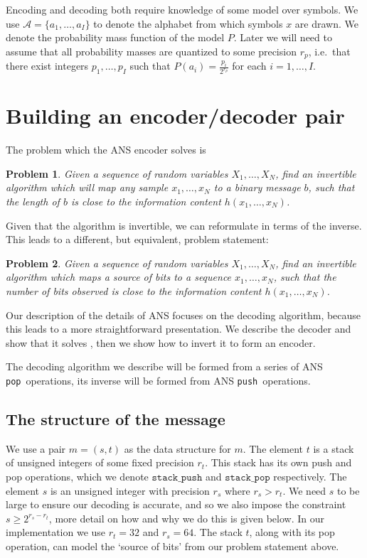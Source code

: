 \documentclass{article}
\newtheorem{problem}{Problem}
\newcommand{\push}{\texttt{push}}
\newcommand{\pop}{\texttt{pop}}
\begin{document}
Encoding and decoding both require knowledge of some model over symbols. We use
\(\mathcal{A} = \{a_1, \ldots, a_I\}\) to denote the alphabet from which
symbols \(x\) are drawn. We denote the probability mass function of the model
\(P\). Later we will need to assume that all probability masses are quantized
to some precision \(r_p\), i.e.\ that there exist integers \(p_1, \ldots, p_I\)
such that
\(P(a_i) = \frac{p_i}{2^{r_p}}\) for each \(i = 1,\ldots,I\).

\section{Building an encoder/decoder pair}
The problem which the ANS encoder solves is

\begin{problem}\label{prob:default}
  Given a sequence of random variables \(X_1, \ldots, X_N\), find an invertible
  algorithm which will map any sample \(x_1, \ldots, x_N\) to a binary message
  \(b\), such that the length of \(b\) is close to the information content
  \(h(x_1, \ldots, x_N)\).
\end{problem}

Given that the algorithm is invertible, we can reformulate 
in terms of the inverse. This leads to a different, but equivalent, problem
statement:

\begin{problem}\label{prob:alt}
  Given a sequence of random variables \(X_1, \ldots, X_N\), find an invertible
  algorithm which maps a source of bits to a sequence \(x_1, \ldots, x_N\),
  such that the number of bits observed is close to the information content
  \(h(x_1, \ldots, x_N)\).
\end{problem}

Our description of the details of ANS focuses on the decoding algorithm,
because this leads to a more straightforward presentation. We describe the
decoder and show that it solves , then we show how to invert it
to form an encoder.

The decoding algorithm we describe will be formed from a series of ANS \pop\
operations, its inverse will be formed from ANS \push\ operations.

\subsection{The structure of the message}\label{sec:message}
We use a pair \(m = (s, t)\) as the data structure for \(m\). The element \(t\)
is a stack of unsigned integers of some fixed precision \(r_t\). This stack has
its own push and pop operations, which we denote \(\texttt{stack\_push}\) and
\(\texttt{stack\_pop}\) respectively. The element \(s\) is an unsigned integer
with precision \(r_s\) where \(r_s > r_t\). We need \(s\) to be large to ensure
our decoding is accurate, and so we also impose the constraint \(s\geq2^{r_s -
r_t}\), more detail on how and why we do this is given below. In our
implementation we use \(r_t = 32\) and \(r_s = 64\). The stack \(t\), along
with its pop operation, can model the `source of bits' from our problem
statement above.
\end{document}
